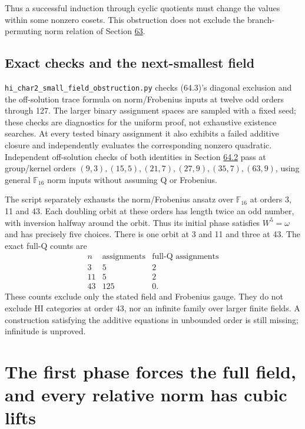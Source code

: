 \documentclass[11pt,reqno]{amsart}
\theoremstyle{plain}
\begin{document}
Thus a successful induction through cyclic quotients must change the
values within some nonzero cosets. This obstruction does not exclude
the branch-permuting norm relation of Section \hyperref[sec:63]{63}.

\subsection{Exact checks and the next-smallest field}\label{sec:64.3}

\texttt{hi\_\allowbreak char2\_\allowbreak small\_\allowbreak field\_\allowbreak obstruction.py} checks (64.3)'s diagonal
exclusion and the off-solution trace formula on norm/Frobenius inputs
at twelve odd orders through 127. The larger binary assignment spaces
are sampled with a fixed seed; these checks are diagnostics for the
uniform proof, not exhaustive existence searches. At every tested
binary assignment it also exhibits a failed additive closure and
independently evaluates the corresponding nonzero quadratic.
Independent off-solution checks of both identities in Section \hyperref[sec:64.2]{64.2}
pass at group/kernel orders
\((9,3),(15,5),(21,7),(27,9),(35,7),(63,9)\), using general
\(\mathbb F_{16}\) norm inputs without assuming Q or Frobenius.

The script separately exhausts the norm/Frobenius ansatz over
\(\mathbb F_{16}\) at orders 3, 11 and 43. Each doubling orbit
at these orders has length twice an odd number, with inversion halfway
around the orbit. Thus its initial phase satisfies \(W^5=\omega\)
and has precisely five choices. There is one orbit at 3 and 11 and
three at 43. The exact full-Q counts are
\[
 \begin{array}{c|r|r}
 n&\text{assignments}&\text{full-Q assignments}\\\hline
 3&5&2\\
 11&5&2\\
 43&125&0.
 \end{array}
\]
These counts exclude only the stated field and Frobenius gauge.
They do not exclude HI categories at order 43, nor an infinite family
over larger finite fields. A construction satisfying the additive
equations in unbounded order is still missing; infinitude is unproved.

\section{The first phase forces the full field, and every relative norm has cubic lifts}\label{sec:65}
\end{document}
